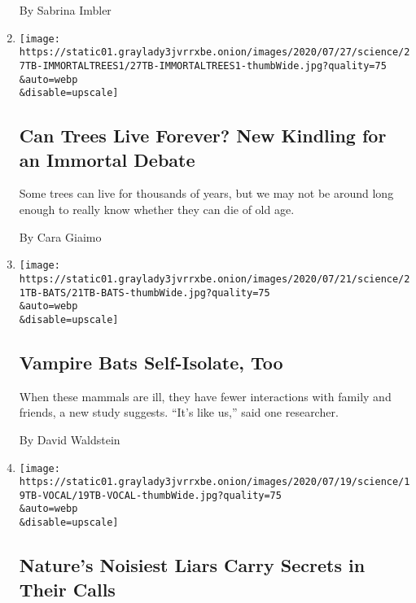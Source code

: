 \begin{enumerate}
  By Sabrina Imbler
\item
  \href{/2020/07/27/science/trees-immortality.html}{}

  \texttt{[image: https://static01.graylady3jvrrxbe.onion/images/2020/07/27/science/27TB-IMMORTALTREES1/27TB-IMMORTALTREES1-thumbWide.jpg?quality=75\\\&auto=webp\\\&disable=upscale]}

  \hypertarget{can-trees-live-forever-new-kindling-for-an-immortal-debate}{%
  \subsection{Can Trees Live Forever? New Kindling for an Immortal
  Debate}\label{can-trees-live-forever-new-kindling-for-an-immortal-debate}}

  Some trees can live for thousands of years, but we may not be around
  long enough to really know whether they can die of old age.

  By Cara Giaimo
\item
  \href{/2020/07/22/science/vampire-bats-viruses.html}{}

  \texttt{[image: https://static01.graylady3jvrrxbe.onion/images/2020/07/21/science/21TB-BATS/21TB-BATS-thumbWide.jpg?quality=75\\\&auto=webp\\\&disable=upscale]}

  \hypertarget{vampire-bats-self-isolate-too}{%
  \subsection{Vampire Bats Self-Isolate,
  Too}\label{vampire-bats-self-isolate-too}}

  When these mammals are ill, they have fewer interactions with family
  and friends, a new study suggests. ``It's like us,'' said one
  researcher.

  By David Waldstein
\item
  \href{/2020/07/21/science/mammals-vocal-learning.html}{}

  \texttt{[image: https://static01.graylady3jvrrxbe.onion/images/2020/07/19/science/19TB-VOCAL/19TB-VOCAL-thumbWide.jpg?quality=75\\\&auto=webp\\\&disable=upscale]}

  \hypertarget{natures-noisiest-liars-carry-secrets-in-their-calls}{%
  \subsection{Nature's Noisiest Liars Carry Secrets in Their
  Calls}\label{natures-noisiest-liars-carry-secrets-in-their-calls}}


\end{enumerate}
